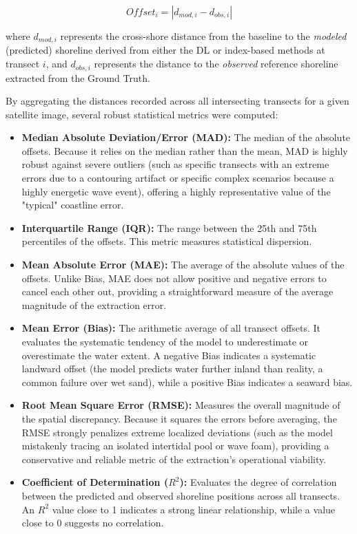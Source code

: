 ﻿\documentclass[ENG]{TFUOC}%
\begin{document}
\begin{equation}
    Offset_i = |d_{mod,i} - d_{obs,i}|
\end{equation}

where $d_{mod,i}$ represents the cross-shore distance from the baseline to the \textit{modeled} (predicted) shoreline derived from either the DL or index-based methods at transect $i$, and $d_{obs,i}$ represents the distance to the \textit{observed} reference shoreline extracted from the Ground Truth.

By aggregating the distances recorded across all intersecting transects for a given satellite image, several robust statistical metrics were computed:
\begin{itemize}
    \item \textbf{Median Absolute Deviation/Error (MAD):} The median of the absolute offsets. Because it relies on the median rather than the mean, MAD is highly robust against severe outliers (such as specific transects with an extreme errors due to a contouring artifact or specific complex scenarios because a highly energetic wave event), offering a highly representative value of the "typical" coastline error.
    \item \textbf{Interquartile Range (IQR):} The range between the 25th and 75th percentiles of the offsets. This metric measures statistical dispersion.
    \item \textbf{Mean Absolute Error (MAE):} The average of the absolute values of the offsets. Unlike Bias, MAE does not allow positive and negative errors to cancel each other out, providing a straightforward measure of the average magnitude of the extraction error.
    \item \textbf{Mean Error (Bias):} The arithmetic average of all transect offsets. It evaluates the systematic tendency of the model to underestimate or overestimate the water extent. A negative Bias indicates a systematic landward offset (the model predicts water further inland than reality, a common failure over wet sand), while a positive Bias indicates a seaward bias.
    \item \textbf{Root Mean Square Error (RMSE):} Measures the overall magnitude of the spatial discrepancy. Because it squares the errors before averaging, the RMSE strongly penalizes extreme localized deviations (such as the model mistakenly tracing an isolated intertidal pool or wave foam), providing a conservative and reliable metric of the extraction's operational viability.
    \item \textbf{Coefficient of Determination ($R^2$):} Evaluates the degree of correlation between the predicted and observed shoreline positions across all transects. An $R^2$ value close to 1 indicates a strong linear relationship, while a value close to 0 suggests no correlation.
\end{itemize}
\end{document}
